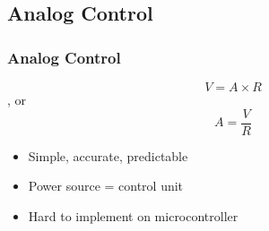 \documentclass[compress, aspectratio=32]{beamer}
\begin{document}
\subsection{Analog Control}
\begin{frame}
    \frametitle{Analog Control}
    \begin{theorem}
        \begin{equation*}
            V = A \times R
        \end{equation*}
        , or
        \begin{equation*}
            A = \frac{V}{R}
        \end{equation*}
    \end{theorem}
    \begin{itemize}
        \item Simple, accurate, predictable
        \item Power source = control unit
        \item Hard to implement on microcontroller
    \end{itemize}
\end{frame}
\end{document}
